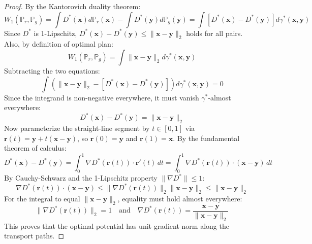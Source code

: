 \documentclass[11pt,a4paper]{article}
\theoremstyle{definition}
\begin{document}
\begin{proof}
By the Kantorovich duality theorem:
{\boldmath
\begin{equation}
W_1(\mathbb{P}_r, \mathbb{P}_g) = \int D^*(\mathbf{x}) d\mathbb{P}_r(\mathbf{x}) - \int D^*(\mathbf{y}) d\mathbb{P}_g(\mathbf{y}) = \int [D^*(\mathbf{x}) - D^*(\mathbf{y})] d\gamma^*(\mathbf{x}, \mathbf{y})
\end{equation}
}
Since $D^*$ is 1-Lipschitz, $D^*(\mathbf{x}) - D^*(\mathbf{y}) \le \|\mathbf{x} - \mathbf{y}\|_2$ holds for all pairs. Also, by definition of optimal plan:
{\boldmath
\begin{equation}
W_1(\mathbb{P}_r, \mathbb{P}_g) = \int \|\mathbf{x} - \mathbf{y}\|_2 d\gamma^*(\mathbf{x}, \mathbf{y})
\end{equation}
}
Subtracting the two equations:
{\boldmath
\begin{equation}
\int \left( \|\mathbf{x} - \mathbf{y}\|_2 - [D^*(\mathbf{x}) - D^*(\mathbf{y})] \right) d\gamma^*(\mathbf{x}, \mathbf{y}) = 0
\end{equation}
}
Since the integrand is non-negative everywhere, it must vanish $\gamma^*$-almost everywhere:
{\boldmath
\begin{equation}
D^*(\mathbf{x}) - D^*(\mathbf{y}) = \|\mathbf{x} - \mathbf{y}\|_2
\end{equation}
}
Now parameterize the straight-line segment by $t \in [0, 1]$ via $\mathbf{r}(t) = \mathbf{y} + t(\mathbf{x} - \mathbf{y})$, so $\mathbf{r}(0) = \mathbf{y}$ and $\mathbf{r}(1) = \mathbf{x}$. By the fundamental theorem of calculus:
{\boldmath
\begin{equation}
D^*(\mathbf{x}) - D^*(\mathbf{y}) = \int_0^1 \nabla D^*(\mathbf{r}(t)) \cdot \mathbf{r}'(t) \, dt = \int_0^1 \nabla D^*(\mathbf{r}(t)) \cdot (\mathbf{x} - \mathbf{y}) \, dt
\end{equation}
}
By Cauchy-Schwarz and the 1-Lipschitz property $\|\nabla D^*\| \le 1$:
{\boldmath
\begin{equation}
\nabla D^*(\mathbf{r}(t)) \cdot (\mathbf{x} - \mathbf{y}) \le \|\nabla D^*(\mathbf{r}(t))\|_2 \|\mathbf{x} - \mathbf{y}\|_2 \le \|\mathbf{x} - \mathbf{y}\|_2
\end{equation}
}
For the integral to equal $\|\mathbf{x} - \mathbf{y}\|_2$, equality must hold almost everywhere:
{\boldmath
\begin{equation}
\|\nabla D^*(\mathbf{r}(t))\|_2 = 1 \quad \text{and} \quad \nabla D^*(\mathbf{r}(t)) = \frac{\mathbf{x} - \mathbf{y}}{\|\mathbf{x} - \mathbf{y}\|_2}
\end{equation}
}
This proves that the optimal potential has unit gradient norm along the transport paths.
\end{proof}
\end{document}

